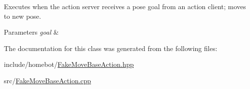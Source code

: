 Executes when the action server receives a pose goal from an action client; moves to new pose. 


\begin{DoxyParams}{Parameters}
{\em goal} & \\
\hline
\end{DoxyParams}


The documentation for this class was generated from the following files\-:\begin{DoxyCompactItemize}
\item 
include/homebot/\hyperlink{FakeMoveBaseAction_8hpp}{Fake\-Move\-Base\-Action.\-hpp}\item 
src/\hyperlink{FakeMoveBaseAction_8cpp}{Fake\-Move\-Base\-Action.\-cpp}\end{DoxyCompactItemize}
